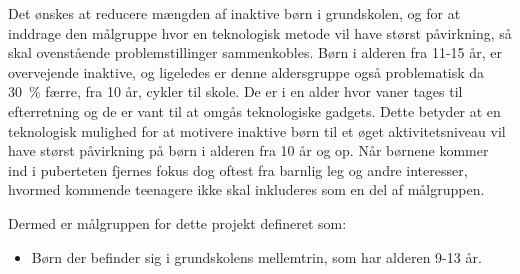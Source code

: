 Det ønskes at reducere mængden af inaktive børn i grundskolen, og for at inddrage den målgruppe hvor en teknologisk metode vil have størst påvirkning, så skal ovenstående problemstillinger sammenkobles. Børn i alderen fra 11-15 år, er overvejende inaktive, og ligeledes er denne aldersgruppe også problematisk da 30~\% færre, fra 10 år, cykler til skole. De er i en alder hvor vaner tages til efterretning og de er vant til at omgås teknologiske gadgets. Dette betyder at en teknologisk mulighed for at motivere inaktive børn til et øget aktivitetsniveau vil have størst påvirkning på børn i alderen fra 10 år og op. Når børnene kommer ind i puberteten fjernes fokus dog oftest fra barnlig leg og andre interesser, hvormed kommende teenagere ikke skal inkluderes som en del af målgruppen. 

Dermed er målgruppen for dette projekt defineret som: 

\begin{itemize}
\item Børn der befinder sig i grundskolens mellemtrin, som har alderen 9-13 år.
\end{itemize}
